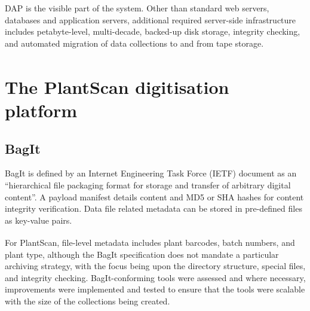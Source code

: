\documentclass{llncs}
\begin{document}
DAP is the visible part of the system. Other than standard web servers,
databases and application servers, additional required server-side
infrastructure includes petabyte-level, multi-decade, backed-up disk storage,
integrity checking, and automated migration of data collections to and from tape
storage.

\section{The PlantScan\textsuperscript{\texttrademark} digitisation platform}


\subsection{BagIt}

BagIt is defined by an Internet Engineering Task Force (IETF) document as an
``hierarchical file packaging format for storage and transfer of arbitrary
digital content''\cite{Kunze2011}. A payload manifest details content and MD5 or SHA hashes
for content integrity verification. Data file related metadata can be stored in
pre-defined files as key-value pairs. 

For PlantScan\textsuperscript{\texttrademark}, file-level metadata
includes plant barcodes, batch numbers, and plant type, although the BagIt
specification does not mandate a particular archiving strategy, with the
focus being upon the directory structure, special files, and integrity checking.
BagIt-conforming tools \cite{Summers} \cite{LoCBagger} were assessed and where necessary,
improvements were implemented and tested to ensure that the tools were scalable with the size of the collections being created. 
\end{document}
